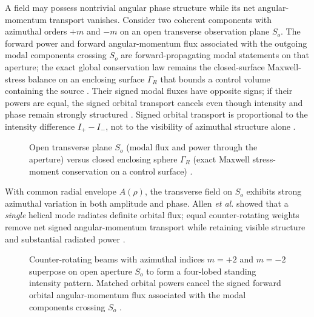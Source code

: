 A field may possess nontrivial angular phase structure while its net angular-momentum transport vanishes. Consider two coherent components with azimuthal orders \(+m\) and \(-m\) on an open transverse observation plane \(S_o\). The forward power and forward angular-momentum flux associated with the outgoing modal components crossing \(S_o\) are forward-propagating modal statements on that aperture; the exact global conservation law remains the closed-surface Maxwell-stress balance on an enclosing surface \(\Gamma_R\) that bounds a control volume containing the source \cite{stratton1941,belinfante1940}. Their signed modal fluxes have opposite signs; if their powers are equal, the signed orbital transport cancels even though intensity and phase remain strongly structured \cite{allen1992}. Signed orbital transport is proportional to the intensity difference \(I_+-I_-\), not to the visibility of azimuthal structure alone \cite{stratton1941}.

\begin{figure}[t]
\centering
\VolIPhysFig{\VolIPhysOpenPlaneVsClosedSphere}
\caption{Open transverse plane $S_o$ (modal flux and power through the aperture) versus closed enclosing sphere $\Gamma_R$ (exact Maxwell stress-moment conservation on a control surface) \cite{stratton1941,beth1936}.}
\label{fig:ch1.open-plane-vs-closed}
\end{figure}

With common radial envelope \(A(\rho)\), the transverse field on \(S_o\) exhibits strong azimuthal variation in both amplitude and phase. Allen \emph{et al.} \cite{allen1992} showed that a \emph{single} helical mode radiates definite orbital flux; equal counter-rotating weights remove net signed angular-momentum transport while retaining visible structure and substantial radiated power \cite{poynting1884}.

\begin{figure}[t]
\centering
\VolIPhysFig{\VolIPhysCounterRotatingAperture}
\caption{Counter-rotating beams with azimuthal indices $m=+2$ and $m=-2$ superpose on open aperture $S_o$ to form a four-lobed standing intensity pattern. Matched orbital powers cancel the signed forward orbital angular-momentum flux associated with the modal components crossing $S_o$ \cite{allen1992,poynting1884}.}
\label{fig:ch1.ex62-counter-rotating-aperture}
\end{figure}

